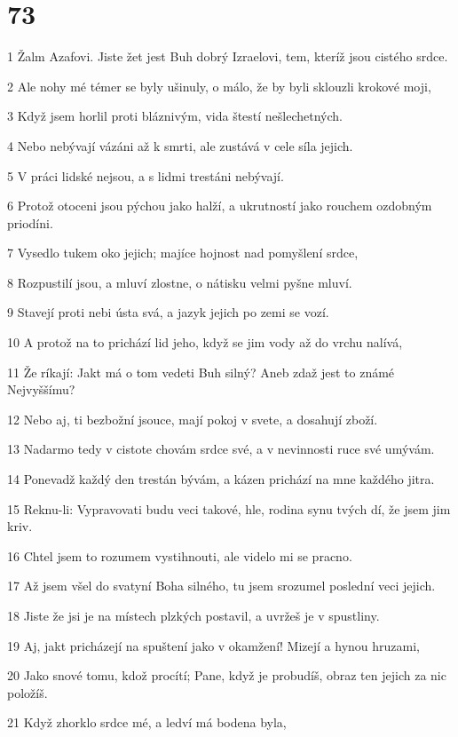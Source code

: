 \chapter{73}

\par 1 Žalm Azafovi. Jiste žet jest Buh dobrý Izraelovi, tem, kteríž jsou cistého srdce.
\par 2 Ale nohy mé témer se byly ušinuly, o málo, že by byli sklouzli krokové moji,
\par 3 Když jsem horlil proti bláznivým, vida štestí nešlechetných.
\par 4 Nebo nebývají vázáni až k smrti, ale zustává v cele síla jejich.
\par 5 V práci lidské nejsou, a s lidmi trestáni nebývají.
\par 6 Protož otoceni jsou pýchou jako halží, a ukrutností jako rouchem ozdobným priodíni.
\par 7 Vysedlo tukem oko jejich; majíce hojnost nad pomyšlení srdce,
\par 8 Rozpustilí jsou, a mluví zlostne, o nátisku velmi pyšne mluví.
\par 9 Stavejí proti nebi ústa svá, a jazyk jejich po zemi se vozí.
\par 10 A protož na to prichází lid jeho, když se jim vody až do vrchu nalívá,
\par 11 Že ríkají: Jakt má o tom vedeti Buh silný? Aneb zdaž jest to známé Nejvyššímu?
\par 12 Nebo aj, ti bezbožní jsouce, mají pokoj v svete, a dosahují zboží.
\par 13 Nadarmo tedy v cistote chovám srdce své, a v nevinnosti ruce své umývám.
\par 14 Ponevadž každý den trestán bývám, a kázen prichází na mne každého jitra.
\par 15 Reknu-li: Vypravovati budu veci takové, hle, rodina synu tvých dí, že jsem jim kriv.
\par 16 Chtel jsem to rozumem vystihnouti, ale videlo mi se pracno.
\par 17 Až jsem všel do svatyní Boha silného, tu jsem srozumel poslední veci jejich.
\par 18 Jiste že jsi je na místech plzkých postavil, a uvržeš je v spustliny.
\par 19 Aj, jakt pricházejí na spuštení jako v okamžení! Mizejí a hynou hruzami,
\par 20 Jako snové tomu, kdož procítí; Pane, když je probudíš, obraz ten jejich za nic položíš.
\par 21 Když zhorklo srdce mé, a ledví má bodena byla,
